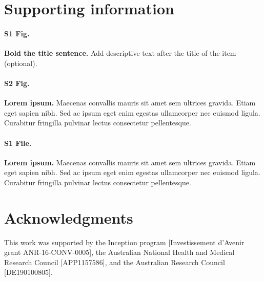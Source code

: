 \documentclass[10pt,letterpaper]{article}
\begin{document}
\section*{Supporting information}

\paragraph*{S1 Fig.}
\label{S1_Fig}
{\bf Bold the title sentence.} Add descriptive text after the title of the item (optional).

\paragraph*{S2 Fig.}
\label{S2_Fig}
{\bf Lorem ipsum.} Maecenas convallis mauris sit amet sem ultrices gravida. Etiam eget sapien nibh. Sed ac ipsum eget enim egestas ullamcorper nec euismod ligula. Curabitur fringilla pulvinar lectus consectetur pellentesque.

\paragraph*{S1 File.}
\label{file:S1_File}
{\bf Lorem ipsum.}  Maecenas convallis mauris sit amet sem ultrices gravida. Etiam eget sapien nibh. Sed ac ipsum eget enim egestas ullamcorper nec euismod ligula. Curabitur fringilla pulvinar lectus consectetur pellentesque.

\section*{Acknowledgments}
This work was supported by the Inception program [Investissement d’Avenir grant ANR-16-CONV-0005], the Australian National Health and Medical Research Council [APP1157586], and the Australian Research Council [DE190100805].

\nolinenumbers


%
%
% 

\end{document}
